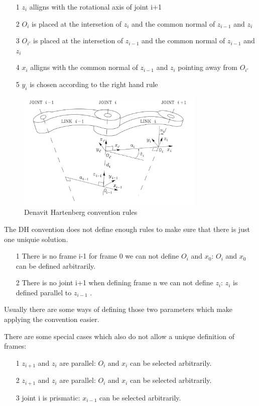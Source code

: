 \documentclass{tpk4170report}
\begin{document}
\begin{itemize}
  \item[1] \(z_{i}\) alligns with the rotational axis of joint i+1
  \item[2] \(O_{i}\) is placed at the intersetion of \(z_{i}\) and the common normal of \(z_{i-1}\) and \(z_{i}\) 
  \item[3] \(O_{i'}\) is placed at the intersetion of \(z_{i-1}\) and the common normal of \(z_{i-1}\) and \(z_{i}\)
  \item[4] \(x_{i}\) alligns with the common normal of \(z_{i-1}\) and \(z_{i}\) pointing away from \(O_{i'}\)
  \item[5] \(y_{i}\) is chosen according to the right hand rule
  \end{itemize}
\begin{figure}
  \centering
  \includegraphics[width=0.8\textwidth]{assets/Denavit_Hartenberg_Convention_Rules.pdf} 
  \caption{Denavit Hartenberg convention rules}
  \label{fig:Denavit_Hartenberg_Konvention_Rules}
\end{figure}

The DH convention does not define enough rules to make sure that there is just one uniquie solution. 

\begin{itemize}
  \item[1] There is no frame i-1 for frame 0 we can not define \(O_{i}\) and \(x_{0}\):  \(O_{i}\) and \(x_{0}\) can be defined arbitrarily.
  \item[2] There is no joint i+1 when defining frame n we can not define \(z_{i}\): \(z_{i}\) is defined parallel to \(z_{i-1}\) . 
\end{itemize}  Usually there are some ways of defining those two parameters which make applying the convention easier.

There are some special cases which also do not allow a unique definition of frames:
\begin{itemize}
  \item[1] \(z_{i+1}\) and \(z_{i}\) are parallel: \(O_{i}\) and \(x_{i}\) can be selected arbitrarily.
  \item[2] \(z_{i+1}\) and \(z_{i}\) are parallel: \(O_{i}\) and \(x_{i}\) can be selected arbitrarily.
  \item[3] joint i is prismatic: \(x_{i-1}\) can be selected arbitrarily.
\end{itemize}
\end{document}
